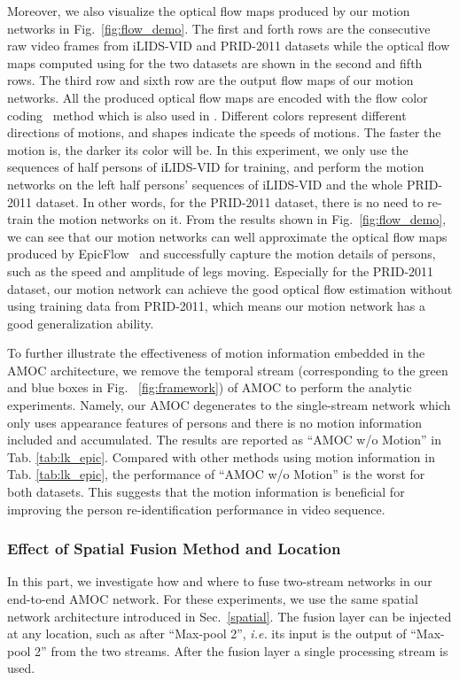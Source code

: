 \documentclass[journal]{IEEEtran}
\begin{document}
 Moreover, we also visualize the optical flow maps produced by our motion networks in Fig.~\ref{fig:flow_demo}.  The first and forth rows are the consecutive raw video frames from iLIDS-VID and PRID-2011 datasets while the optical flow maps computed using \cite{revaud2015epicflow} for the two datasets are shown in the second and fifth rows. The third row and sixth row are the output flow maps of our motion networks. All the produced optical flow maps are encoded with the flow color coding~\cite{baker2011database} method which is also used  in \cite{revaud2015epicflow}. Different colors represent different directions of motions, and shapes indicate the speeds of motions. The faster the motion is, the darker its color will be.  In this experiment, we only use the sequences of half persons of iLIDS-VID for training, and perform the motion networks on the left half persons' sequences of iLIDS-VID and the whole PRID-2011 dataset. In other words, for the PRID-2011 dataset, there is no need to re-train the motion networks on it. From the results shown in Fig.~\ref{fig:flow_demo}, we can see that our motion networks can well approximate the optical flow maps produced by EpicFlow~\cite{revaud2015epicflow} and successfully capture the motion details of persons, such as the speed and amplitude of legs moving. Especially for the PRID-2011 dataset, our motion network can achieve the good optical flow estimation without using training data from PRID-2011, which means our motion network has a good generalization ability. 
 
 To further illustrate the effectiveness of motion information embedded in the AMOC architecture, we remove the temporal stream (corresponding to the green and blue boxes in Fig. ~\ref{fig:framework}) of AMOC to perform the analytic experiments. Namely, our AMOC degenerates to the single-stream network which only uses appearance features of persons and there is no motion information included and accumulated. The results are reported as ``AMOC w/o Motion'' in Tab. \ref{tab:lk_epic}. Compared with other methods using motion information in Tab. \ref{tab:lk_epic}, the performance of ``AMOC w/o Motion'' is the worst for both datasets. This suggests that the motion information is beneficial for improving the person re-identification performance in video sequence.
  
   
 
 




\subsubsection{Effect of Spatial Fusion Method and Location}
In this part, we investigate how and where to fuse two-stream networks in our end-to-end AMOC network. For these experiments, we use the same spatial network architecture introduced in Sec.~\ref{spatial}. The fusion layer can be injected at any location, such as after ``Max-pool 2'', \textit{i.e.} its input is the output of ``Max-pool 2'' from the two streams. After the fusion layer a single processing stream is used. 
\end{document}
